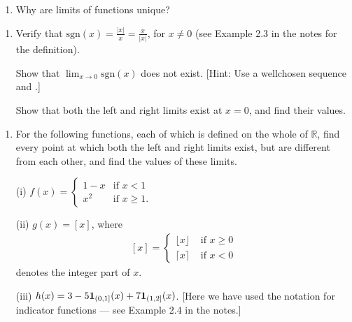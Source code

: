 \documentclass[letterpaper,10pt,english]{jupyterBook}
\begin{document}
\label{\detokenize{Problems:id6}}\begin{enumerate}
%
\setcounter{enumi}{5}
\item {} 
\sphinxAtStartPar
Why are limits of functions unique?

\end{enumerate}
\label{\detokenize{Problems:id7}}\begin{enumerate}
%
\setcounter{enumi}{6}
\item {} 
\sphinxAtStartPar
Verify that \(\text{sgn}(x) = \displaystyle\frac{|x|}{x} = \displaystyle\frac{x}{|x|}\), for \(x \neq 0\) (see Example 2.3  in the notes for the definition).

Show that \(\displaystyle\lim_{x \rightarrow 0}\text{sgn}(x)\) does not exist. {[}Hint: Use a well\sphinxhyphen{}chosen sequence and .{]}

Show that both the left and right limits exist at \(x=0\), and find their values.

\end{enumerate}
\label{\detokenize{Problems:id8}}\begin{enumerate}
%
\setcounter{enumi}{7}
\item {} 
\sphinxAtStartPar
For the following functions, each of which is defined on the whole of \(\mathbb{R}\), find every point at which both the left and right limits exist, but are different from each other, and find the values of these limits.

\sphinxAtStartPar
(i) \(f(x) = \begin{cases} 1 -x & \text{if }x < 1\\ x^{2}& \text{if }x \geq 1. \end{cases}\)

\sphinxAtStartPar
(ii) \(g(x) = [x]\), where
\begin{equation}\label{equation:Problems:eq:[x]}
\begin{split}[x] = \left\{\begin{array}{cl} \lfloor x\rfloor & \text{ if } x\geq 0 \\ \lceil x \rceil & \text{ if } x<0 \end{array}\right.\end{split}
\end{equation}
\sphinxAtStartPar
denotes the integer part of \(x\).

\sphinxAtStartPar
(iii) \(h(x) =3 - 5{\bf 1}_{(0, 1]}(x) + 7{\bf 1}_{(1, 2]}(x)\). {[}Here we have used the notation for indicator functions — see Example 2.4 in the notes.{]}

\end{enumerate}
\end{document}
